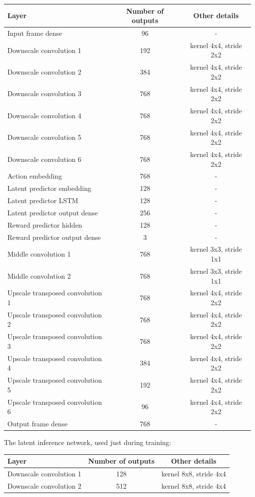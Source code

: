 \begin{tabular}{ l c c }
Layer & Number of outputs & Other details \\ \hline
Input frame dense & 96 & - \\
Downscale convolution 1 & 192 & kernel 4x4, stride 2x2 \\
Downscale convolution 2 & 384 & kernel 4x4, stride 2x2 \\
Downscale convolution 3 & 768 & kernel 4x4, stride 2x2 \\
Downscale convolution 4 & 768 & kernel 4x4, stride 2x2 \\
Downscale convolution 5 & 768 & kernel 4x4, stride 2x2 \\
Downscale convolution 6 & 768 & kernel 4x4, stride 2x2 \\
Action embedding & 768 & - \\
Latent predictor embedding & 128 & - \\
Latent predictor LSTM & 128 & - \\
Latent predictor output dense & 256 & - \\
Reward predictor hidden & 128 & - \\
Reward predictor output dense & 3 & - \\
Middle convolution 1 & 768 & kernel 3x3, stride 1x1 \\
Middle convolution 2 & 768 & kernel 3x3, stride 1x1 \\
Upscale transposed convolution 1 & 768 & kernel 4x4, stride 2x2 \\
Upscale transposed convolution 2 & 768 & kernel 4x4, stride 2x2 \\
Upscale transposed convolution 3 & 768 & kernel 4x4, stride 2x2 \\
Upscale transposed convolution 4 & 384 & kernel 4x4, stride 2x2 \\
Upscale transposed convolution 5 & 192 & kernel 4x4, stride 2x2 \\
Upscale transposed convolution 6 & 96 & kernel 4x4, stride 2x2 \\
Output frame dense & 768 & - \\
\end{tabular}

The latent inference network, used just during training:

\begin{tabular}{ l c c }
Layer & Number of outputs & Other details \\ \hline
Downscale convolution 1 & 128 & kernel 8x8, stride 4x4 \\
Downscale convolution 2 & 512 & kernel 8x8, stride 4x4 \\
\end{tabular}

